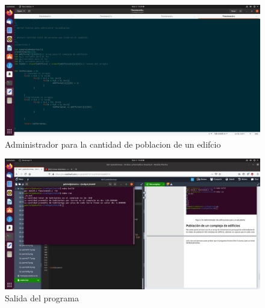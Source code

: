 \documentclass[
  letterpaper, 
  maincolor=black,
  sectioncolor=black!90,
  subsectioncolor=black!70,
  itemtextcolor=black!40,
]{fortysecondscv}
\begin{document}
        \begin{figure}[H]
            \centering
            \includegraphics[trim= 50 30 780 90,clip,width=1.20\textwidth]{img/punto9.png}
            \caption{Administrador para la cantidad de poblacion de un edifcio}
            \label{fig:my_label}
        \end{figure}
        \begin{figure}[H]
            \centering
            \includegraphics[trim= 135 500 850 150,clip,width=1.20\textwidth]{img/punto9-9.png}
            \caption{Salida del programa}
            \label{fig:my_label}
        \end{figure}

        
        
        
        
    
    

    
\end{document}
